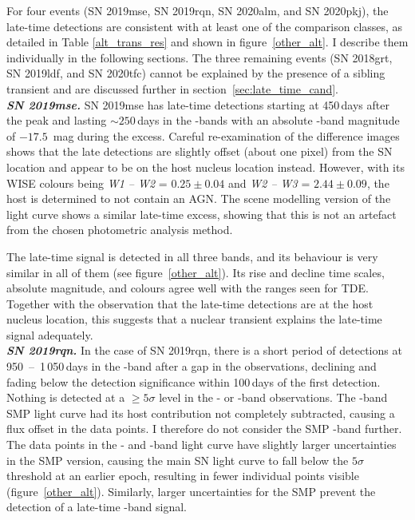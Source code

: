 \documentclass[a4paper,oneside,12pt, class=Latex/Classes/PhDthesisPSnPDF, crop=false]{standalone}
\begin{document}
For four events (SN 2019mse, SN 2019rqn, SN 2020alm, and SN 2020pkj), the late-time detections are consistent with at least one of the comparison classes, as detailed in Table \ref{alt_trans_res} and shown in figure~\ref{other_alt}. I describe them individually in the following sections. The three remaining events (SN 2018grt, SN 2019ldf, and SN 2020tfc) cannot be explained by the presence of a sibling transient and are discussed further in section~\ref{sec:late_time_cand}.\\

\textit{\textbf{SN 2019mse.}}
SN 2019mse has late-time detections starting at 450\,days after the peak and lasting $\sim250$\,days in the \ztfg\ztfr\ztfi-bands with an absolute \ztfr-band magnitude of $-17.5$~mag during the excess. Careful re-examination of the difference images shows that the late detections are slightly offset (about one pixel) from the SN location and appear to be on the host nucleus location instead. However, with its WISE colours being \textit{W1 -- W2} = $0.25\pm0.04$ and \textit{W2 -- W3} = $2.44\pm0.09$, the host is determined to not contain an AGN. The scene modelling version of the light curve shows a similar late-time excess, showing that this is not an artefact from the chosen photometric analysis method.

The late-time signal is detected in all three bands, and its behaviour is very similar in all of them (see figure~\ref{other_alt}). Its rise and decline time scales, absolute magnitude, and colours agree well with the ranges seen for TDE. Together with the observation that the late-time detections are at the host nucleus location, this suggests that a nuclear transient explains the late-time signal adequately.\\

\textit{\textbf{SN 2019rqn.}}
In the case of SN 2019rqn, there is a short period of detections at 950~--~1\,050\,days in the \ztfr-band after a gap in the observations, declining and fading below the detection significance within 100\,days of the first detection. Nothing is detected at a $\geq 5 \sigma$ level in the \ztfg- or \ztfi-band observations. The \ztfi-band SMP light curve had its host contribution not completely subtracted, causing a flux offset in the data points. I therefore do not consider the SMP \ztfi-band further. The data points in the \ztfg- and \ztfr-band light curve have slightly larger uncertainties in the SMP version, causing the main SN light curve to fall below the $5\sigma$ threshold at an earlier epoch, resulting in fewer individual points visible (figure~\ref{other_alt}). Similarly, larger uncertainties for the SMP prevent the detection of a late-time \ztfr-band signal.
\end{document}
